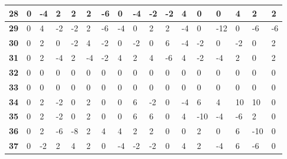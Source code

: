 \begin{longtable}[c]{|l|l|l|l|l|l|l|l|l|l|l|l|l|l|l|l|l|}
\textbf{28} & 0          & -4         & 2          & 2          & 2          & -6         & 0          & -4         & -2         & -2         & 4           & 0           & 0           & 4           & 2           & 2            \\ \hline
\textbf{29} & 0          & 4          & -2         & -2         & 2          & -6         & -4         & 0          & 2          & 2          & -4          & 0           & -12         & 0           & -6          & -6           \\ \hline
\textbf{30} & 0          & 2          & 0          & -2         & 4          & -2         & 0          & -2         & 0          & 6          & -4          & -2          & 0           & -2          & 0           & 2            \\ \hline
\textbf{31} & 0          & 2          & -4         & 2          & -4         & -2         & 4          & 2          & 4          & -6         & 4           & -2          & -4          & 2           & 0           & 2            \\ \hline
\textbf{32} & 0          & 0          & 0          & 0          & 0          & 0          & 0          & 0          & 0          & 0          & 0           & 0           & 0           & 0           & 0           & 0            \\ \hline
\textbf{33} & 0          & 0          & 0          & 0          & 0          & 0          & 0          & 0          & 0          & 0          & 0           & 0           & 0           & 0           & 0           & 0            \\ \hline
\textbf{34} & 0          & 2          & -2         & 0          & 2          & 0          & 0          & 6          & -2         & 0          & -4          & 6           & 4           & 10          & 10          & 0            \\ \hline
\textbf{35} & 0          & 2          & -2         & 0          & 2          & 0          & 0          & 6          & 6          & 0          & 4           & -10         & -4          & -6          & 2           & 0            \\ \hline
\textbf{36} & 0          & 2          & -6         & -8         & 2          & 4          & 4          & 2          & 2          & 0          & 0           & 2           & 0           & 6           & -10         & 0            \\ \hline
\textbf{37} & 0          & -2         & 2          & 4          & 2          & 0          & -4         & -2         & -2         & 0          & 4           & 2           & -4          & 6           & -6          & 0            \\ \hline

\end{longtable}
